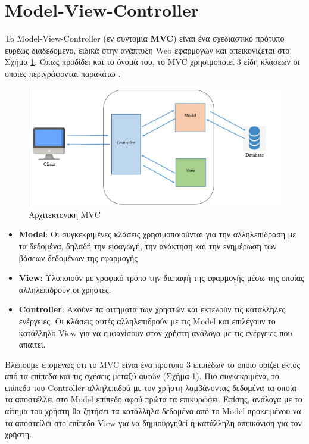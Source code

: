 \section{Model-View-Controller}
\label{sec:mvc}

To Model-View-Controller (εν συντομία \textbf{MVC}) είναι ένα σχεδιαστικό πρότυπο ευρέως διαδεδομένο, ειδικά στην ανάπτυξη Web εφαρμογών και απεικονίζεται στο Σχήμα \ref{fig:mvc}. Όπως προδίδει και το όνομά του, το MVC χρησιμοποιεί 3 είδη κλάσεων οι οποίες περιγράφονται παρακάτω \cite{MVCPaper}.

\begin{figure}[h]
    \centering
    \includegraphics[scale=0.41]{images/chapter4/mvc.png}
    \caption{Αρχιτεκτονική MVC}
    \label{fig:mvc}
\end{figure}

\begin{itemize}
    \item \textbf{Model}: Οι συγκεκριμένες κλάσεις χρησιμοποιούνται για την αλληλεπίδραση με τα δεδομένα, δηλαδή την εισαγωγή, την ανάκτηση και την ενημέρωση των βάσεων δεδομένων της εφαρμογής 
    \item \textbf{View}: Υλοποιούν με γραφικό τρόπο την διεπαφή της εφαρμογής μέσω της οποίας αλληλεπιδρούν οι χρήστες.
    \item \textbf{Controller}: Ακούνε τα αιτήματα των χρηστών και εκτελούν τις κατάλληλες ενέργειες. Οι κλάσεις αυτές αλληλεπιδρούν με τις Model και επιλέγουν το κατάλληλο View για να εμφανίσουν στον χρήστη ανάλογα με τις ενέργειες που απαιτεί.
\end{itemize}

Βλέπουμε επομένως ότι το MVC είναι ένα πρότυπο 3 επιπέδων το οποίο ορίζει εκτός από τα επίπεδα και τις σχέσεις μεταξύ αυτών (Σχήμα \ref{fig:mvc}). Πιο συγκεκριμένα, το επίπεδο του Controller αλληλεπιδρά με τον χρήστη λαμβάνοντας δεδομένα τα οποία τα αποστέλλει στο Model επίπεδο αφού πρώτα τα επικυρώσει. Επίσης, ανάλογα με το αίτημα του χρήστη θα ζητήσει τα κατάλληλα δεδομένα από το Model προκειμένου να τα αποστείλει στο επίπεδο View για να δημιουργηθεί η κατάλληλη απεικόνιση για τον χρήστη.

